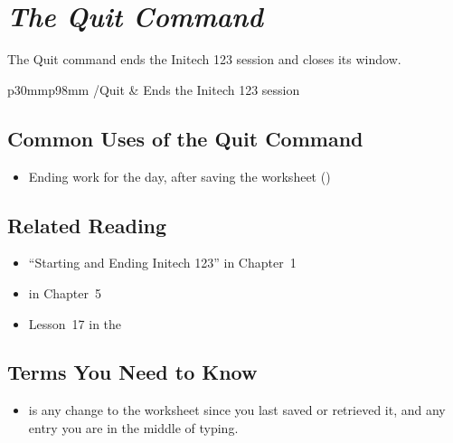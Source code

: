 \chapter[The Quit Command]{\textit{The Quit Command}}


The Quit command ends the Initech 123 session and closes its window.

\begin{LotTable}{p{30mm}p{98mm}}
/Quit & Ends the Initech 123 session\LotEnd
\end{LotTable}

\section{Common Uses of the Quit Command}
\begin{itemize}
\item Ending work for the day, after saving the worksheet
  ()
\end{itemize}

\section{Related Reading}
\begin{itemize}
\item ``Starting and Ending Initech 123'' in Chapter~1
\item {} in Chapter~5
\item Lesson~17 in the 
\end{itemize}

\section{Terms You Need to Know}
\begin{itemize}
\item {} is any change to the worksheet since you last
  saved or retrieved it, and any entry you are in the middle of typing.
\end{itemize}

